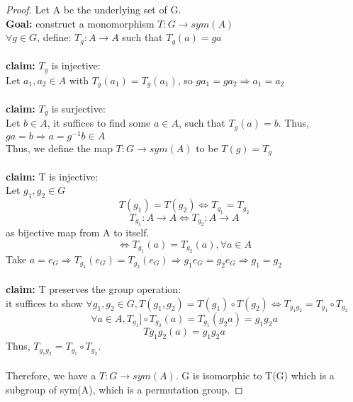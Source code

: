\documentclass{article}
\begin{document}
    \begin{proof}
        Let A be the underlying set of G.\\
        \indent \textbf{Goal:} construct a monomorphism \(T:G \rightarrow sym(A)\)\\
        \indent \(\forall g \in G\), define: \(T_g: A \rightarrow A\)
        such that \(T_g(a)=ga\)\\\\
        \indent \textbf{claim:} \(T_g\) is injective:\\
        \indent Let \(a_1,a_2 \in A\) with \(T_g(a_1)=T_g(a_1)\), 
        so \(ga_1=ga_2 \Rightarrow a_1=a_2\)\\\\
        \indent \textbf{claim:} \(T_g\) is surjective:\\
        \indent Let \(b \in A\), it suffices to find some \(a \in A\),
        such that \(T_g(a)=b\). 
        Thus, \(ga = b \Rightarrow a = g^{-1}b \in A\)\\
        \indent Thus, we define the map \(T:G\rightarrow sym(A)\) 
        to be \(T(g)=T_g\)\\\\
        \indent \textbf{claim:} T is injective:\\
        \indent Let \(g_1,g_2 \in G\)
        \[T(g_1)=T(g_2) \iff T_{g_1}=T_{g_2}\]
        \[T_{g_1}:A\rightarrow A \iff T_{g_2}:A\rightarrow A\]
        \indent as bijective map from A to itself.
        \[\iff T_{g_1}(a)=T_{g_2}(a), \forall a \in A\]
        \indent Take \(a=e_G \Rightarrow T_{g_1}(e_G)=T_{g_2}(e_G)
        \Rightarrow g_1e_G=g_2e_G \Rightarrow g_1 = g_2\)\\\\
        \indent \textbf{claim:} T preserves the group operation:\\
        it suffices to show \(\forall g_1,g_2 \in G, T(g_1,g_2)=T(g_1)
        \circ T(g_2) \iff T_{g_1g_2} = T_{g_1}\circ T_{g_2}\)\\
        \[\forall a \in A, T_{g_1}]\circ T_{g_2}(a) = T_{g_1}(g_2a)
        =g_1g_2a\]
        \[Tg_1g_2(a) = g_1g_2a\]
        Thus, \(T_{g_1g_2} = T_{g_1}\circ T_{g_2}\).\\\\
        Therefore, we have a \(T:G \rightarrow sym(A)\). G is isomorphic 
        to T(G) which is a subgroup of sym(A), which is a permutation group.

    \end{proof}
\end{document}

